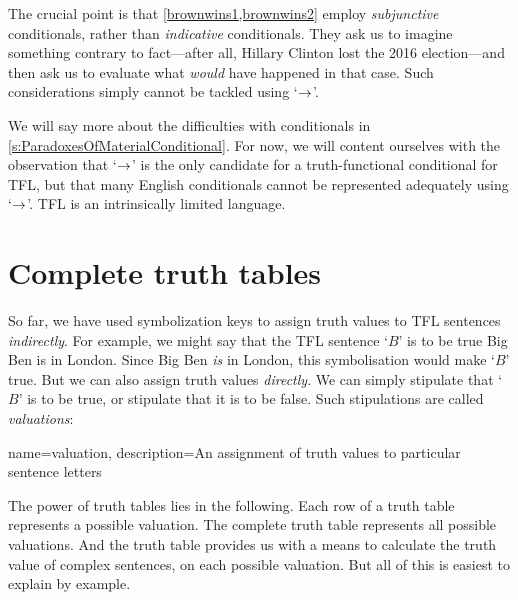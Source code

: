 The crucial point is that \cref*{brownwins1,brownwins2} employ \emph{subjunctive} conditionals, rather than \emph{indicative} conditionals. They ask us to imagine something contrary to fact---after all, Hillary Clinton lost the 2016 election---and then ask us to evaluate what \emph{would} have happened in that case. Such considerations simply cannot be tackled using `$\rightarrow$'.

We will say more about the difficulties with conditionals in \cref{s:ParadoxesOfMaterialConditional}. For now, we will content ourselves with the observation that `$\rightarrow$' is the only candidate for a truth-functional conditional for TFL, but that many English conditionals cannot be represented adequately using `$\rightarrow$'. TFL is an intrinsically limited language.


\chapter{Complete truth tables}
\label{s:CompleteTruthTables}

So far, we have used symbolization keys to assign truth values to TFL sentences \emph{indirectly}. For example, we might say that the TFL sentence `$B$' is to be true \ifeff{} Big Ben is in London. Since Big Ben \emph{is} in London, this symbolisation would make `$B$' true. But we can also assign truth values \emph{directly}. We can simply stipulate that `$B$' is to be true, or stipulate that it is to be false. Such stipulations are called \emph{valuations}: 

{
name=valuation,
description={An assignment of \glspl{truth value} to particular \glspl{sentence letter}}
}

The power of truth tables lies in the following. Each row of a truth table represents a possible valuation. The complete truth table represents all possible valuations. And the truth table provides us with a means to calculate the truth value of complex sentences, on each possible valuation. But all of this is easiest to explain by example.

